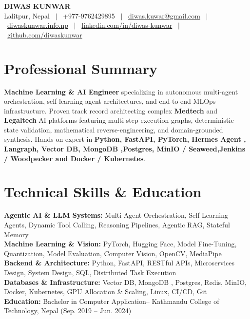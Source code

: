 \documentclass[9.5pt,letterpaper]{article}
\begin{document}
\color{black}

\begin{center}
    {\LARGE \textbf{DIWAS KUNWAR}} \\ \vspace{2pt}
    \small
    Lalitpur, Nepal \ $|$ \ +977-9762429895 \ $|$ \
    \href{mailto:diwas.kuwar@gmail.com}{diwas.kuwar@gmail.com} \ $|$ \
    \href{https://diwaskunwar.info.np/}{diwaskunwar.info.np} \ $|$ \
    \href{https://www.linkedin.com/in/diwas-kunwar/}{linkedin.com/in/diwas-kunwar} \ $|$ \
    \href{https://github.com/diwaskunwar}{github.com/diwaskunwar}
\end{center}
\vspace{-10pt}

\section{Professional Summary}
\begin{small}
\noindent \textbf{Machine Learning \& AI Engineer} specializing in autonomous multi-agent orchestration, self-learning agent architectures, and end-to-end MLOps infrastructure. Proven track record architecting complex \textbf{Medtech} and \textbf{Legaltech} AI platforms featuring multi-step execution graphs, deterministic state validation, mathematical reverse-engineering, and domain-grounded synthesis. Hands-on expert in \textbf{Python, FastAPI, PyTorch, Hermes Agent , Langraph, Vector DB, MongoDB ,Postgres, MinIO / Seaweed,Jenkins / Woodpecker and Docker / Kubernetes}.
\end{small}

\section{Technical Skills \& Education}
 \begin{itemize}[leftmargin=0.12in, label={}, topsep=1pt, parsep=0pt, itemsep=1pt]
    \small{\item{
     \textbf{Agentic AI \& LLM Systems:}{ Multi-Agent Orchestration, Self-Learning Agents, Dynamic Tool Calling, Reasoning Pipelines, Agentic RAG, Stateful Memory} \\
     \textbf{Machine Learning \& Vision:}{ PyTorch, Hugging Face, Model Fine-Tuning, Quantization, Model Evaluation, Computer Vision, OpenCV, MediaPipe} \\
     \textbf{Backend \& Architecture:}{ Python, FastAPI, RESTful APIs, Microservices Design, System Design, SQL, Distributed Task Execution} \\
     \textbf{Databases \& Infrastructure:}{ Vector DB, MongoDB , Postgres, Redis, MinIO, Docker, Kubernetes, GPU Allocation \& Scaling, Linux, CI/CD, Git} \\
     \textbf{Education:}{ Bachelor in Computer Application-- Kathmandu College of Technology, Nepal (Sep. 2019 -- Jun. 2024)}
    }}
 \end{itemize}
\end{document}
